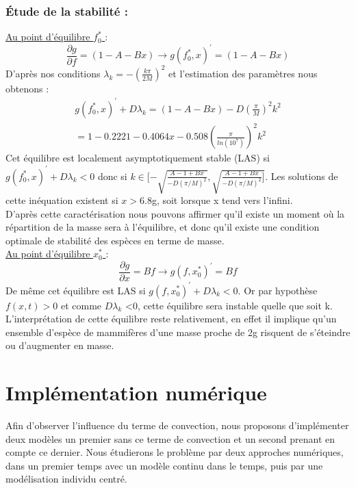 \documentclass[fleqn,10pt]{SelfArx}
\begin{document}
\subsubsection*{Étude de la stabilité :} 
\underline{Au point d'équilibre $f^*_0$ } : \\
$$\frac{\partial g}{\partial f} = (1-A-Bx) \rightarrow g(f^*_0 , x)^\prime = (1-A-Bx)$$
D'après nos conditions  $\lambda_k =-(\frac{k\pi}{2M})^2 $ et l'estimation des paramètres nous obtenons :
\begin{align*}
g(f^*_0 , x)^\prime + D \lambda_k = (1-A-Bx) - D(\frac{\pi}{M}) ^2k^2\\
= 1 - 0.2221 - 0.4064 x - 0.508(\frac{\pi}{ln(10^7)})^2k^2
\end{align*}
Cet équilibre est localement asymptotiquement stable (LAS) si $g(f^*_0 , x)^\prime + D \lambda_k <0 $ donc si $k \in [-\sqrt{\frac{A-1+Bx}{-D(\pi /M)^2}},\sqrt{\frac{A-1+Bx}{-D(\pi /M)^2} ]}$. Les solutions de cette inéquation existent si $x>6.8$g, soit lorsque x tend vers l'infini.\\
D'après cette caractérisation nous pouvons affirmer qu'il existe un moment où la répartition de la masse sera à l'équilibre, et donc qu'il existe une condition optimale de stabilité des espèces en terme de masse.\\
\underline{Au point d'équilibre $x^*_0$ } : \\
$$\frac{\partial g}{\partial x} = Bf \rightarrow g(f , x^*_0)^\prime = Bf$$
De même cet équilibre est LAS si $g(f , x^*_0)^\prime + D \lambda_k <0 $. Or par hypothèse $f(x,t) >0$ et comme $D\lambda_k$ <0, cette équilibre sera instable quelle que soit k. \\
L'interprétation de cette équilibre reste relativement, en effet il implique qu'un ensemble d'espèce de mammifères d'une masse proche de 2g risquent de s'éteindre ou d'augmenter en masse.


\section*{Implémentation numérique}
Afin d'observer l'influence du terme de convection, nous proposons d'implémenter deux modèles un premier sans ce terme de convection et un second prenant en compte ce dernier. Nous étudierons le problème par deux approches numériques, dans un premier temps avec un modèle continu dans le temps, puis par une modélisation individu centré.
\end{document}
